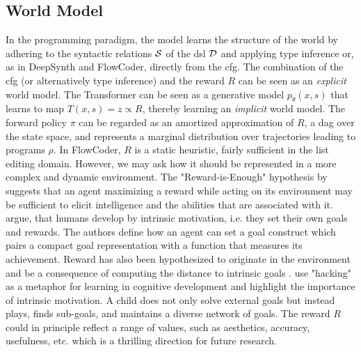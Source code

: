 \subsection{World Model}
In the programming paradigm, the model learns the structure of the world by adhering to the syntactic relations $\cal{S}$ of the \acrshort{dsl} $\cal{D}$ and applying type inference or, as in DeepSynth and FlowCoder, directly from the \acrshort{cfg}. The combination of the \acrshort{cfg} (or alternatively type inference) and the reward $R$ can be seen as an \emph{explicit} world model. 
The Transformer can be seen as a generative model $p_\theta (x, s)$ that learns to map $T(x, s) = z \propto R$, thereby learning an \emph{implicit} world model.
The forward policy $\pi$ can be regarded as an amortized approximation of $R$, a \acrshort{dag} over the state space, and represents a marginal distribution over trajectories leading to programs $\rho$.
In FlowCoder, $R$ is a static heuristic, fairly sufficient in the list editing domain. However, we may ask how it should be represented in a more complex and dynamic environment.
The "Reward-is-Enough" hypothesis by \citet{silverRewardEnough2021} suggests that an agent maximizing a reward while acting on its environment may be sufficient to elicit intelligence and the abilities that are associated with it. \citet{colasAutotelicAgentsIntrinsically2022} argue, that humans develop by intrinsic motivation, i.e. they set their own goals and rewards. The authors define how an agent can set a goal construct which pairs a compact goal representation with a function that measures its achievement. Reward has also been hypothesized to originate in the environment and be a consequence of computing the distance to intrinsic goals \cite{Juechems_Summerfield_2019}. \citet{ruleChildHacker2020} use "hacking" as a metaphor for learning in cognitive development and highlight the importance of intrinsic motivation. A child does not only solve external goals but instead plays, finds sub-goals, and maintains a diverse network of goals. The reward $R$ could in principle reflect a range of values, such as aesthetics, accuracy, usefulness, etc. which is a thrilling direction for future research. 


